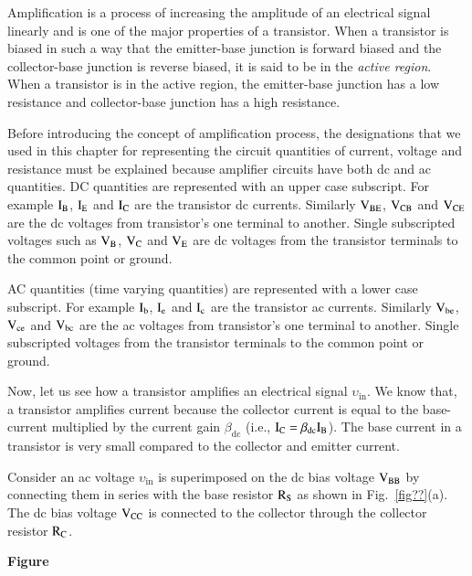 Amplification is a process of increasing the amplitude of an electrical signal linearly and is one of the major properties of a transistor. When a transistor is biased in such a way that the emitter-base junction is forward biased and the collector-base junction is reverse biased, it is said to be in the {\em active region}. When a transistor is in the active region, the emitter-base junction has a low resistance and collector-base junction has a high resistance.

Before introducing the concept of amplification process, the designations that we used in this chapter for representing the circuit quantities of current, voltage and resistance must be explained because amplifier circuits have both dc and ac quantities. DC quantities are represented with an upper case subscript. For example $\textrm{I}_{\textrm{B}}$, $\textrm{I}_{\textrm{E}}$ and $\textrm{I}_{\textrm{C}}$ are the transistor dc currents. Similarly $\textrm{V}_{\text{BE}}$, $\textrm{V}_{\text{CB}}$ and $\textrm{V}_{\text{CE}}$ are the dc voltages from transistor's one terminal to another. Single subscripted voltages such as $\textrm{V}_{\textrm{B}}$, $\textrm{V}_{\textrm{C}}$ and $\textrm{V}_{\textrm{E}}$ are dc voltages from the transistor terminals to the common point or ground.

AC quantities (time varying quantities) are represented with a lower case subscript. For example $\textrm{I}_{\textrm{b}}$, $\textrm{I}_{\textrm{e}}$ and $\textrm{I}_{\textrm{c}}$ are the transistor ac currents. Similarly $\textrm{V}_{\text{be}}$, $\textrm{V}_{\text{ce}}$ and $\textrm{V}_{\text{bc}}$ are the ac voltages from transistor's one terminal to another. Single subscripted voltages from the transistor terminals to the common point or ground.

Now, let us see how a transistor amplifies an electrical signal $\upsilon_{\text{in}}$. We know that, a transistor amplifies current because the collector current is equal to the base-current multiplied by the current gain $\beta_{\text{dc}}$ (i.e., $\textrm{I}_{\textrm{C}}=\beta_{\text{dc}}\textrm{I}_{\textrm{B}}$). The base current in a transistor is very small compared to the collector and emitter current.

Consider an ac voltage $\upsilon_{\text{in}}$ is superimposed on the dc bias voltage $\textrm{V}_{\text{BB}}$ by connecting them in series with the base resistor $\textrm{R}_{\textrm{S}}$ as shown in Fig.~\ref{fig??}(a). The dc bias voltage $\textrm{V}_{\text{CC}}$ is connected to the collector through the collector resistor $\textrm{R}_{\textrm{C}}$.
\begin{center}
{\bf Figure}
\end{center}

